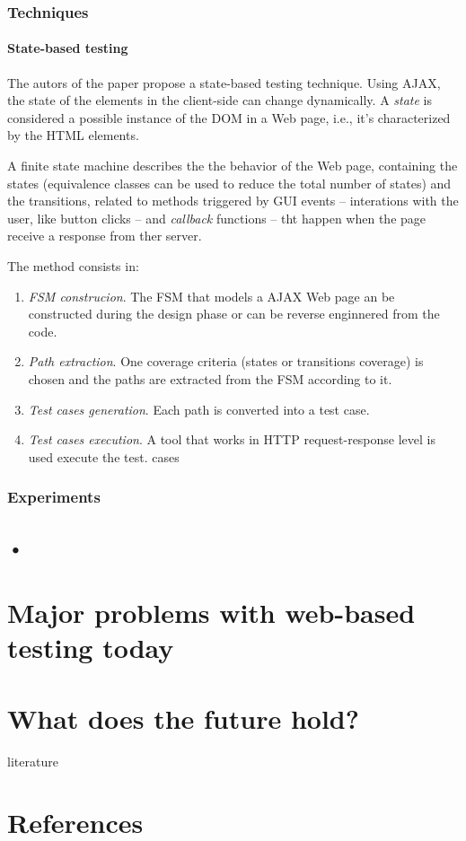 \documentclass[a4paper]{article}
\begin{document}
\subsubsection{Techniques}

\paragraph{State-based testing}

The autors of the paper \cite{mtr08} propose a state-based testing technique.
Using AJAX, the state of the elements in the client-side can change dynamically.
A \emph{state} is considered a possible instance of the DOM in a Web page, i.e., it's characterized by the HTML elements.

A finite state machine describes the the behavior of the Web page, containing the states (equivalence classes can be used to reduce the total number of states) and the transitions, related to methods triggered by GUI events -- interations with the user, like button clicks -- and \emph{callback} functions -- tht happen when the page receive a response from ther server.

The method consists in: 

\begin{enumerate}
\item \emph{FSM construcion}. The FSM that models a AJAX Web page an be constructed during the design phase or can be reverse enginnered from the code.
\item \emph{Path extraction}. One coverage criteria (states or transitions coverage) is chosen and the paths are extracted from the FSM according to it.
\item \emph{Test cases generation}. Each path is converted into a test case.
\item \emph{Test cases execution}. A tool that works in HTTP request-response level is used execute the test. cases
\end{enumerate}

\subsubsection{Experiments}

\subsection{•}

\section{Major problems with web-based testing today}

\section{What does the future hold?}

\newpage
\appendix

\begin{btSect}[alpha]{literature}
\section{References}
\btPrintAll
\end{btSect}
\end{document}
